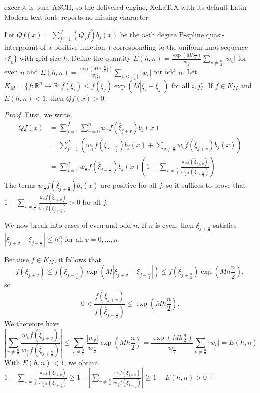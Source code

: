 \documentclass[10pt,a4paper]{amsart}
\newcommand{\floorn}{\lfloor \frac{n}{2}\rfloor}
\newcommand{\fracn}{\frac{n}{2}}
\begin{document}
excerpt is pure ASCII, so the delivered engine, XeLaTeX with its default Latin Modern text font, reports no missing character.
\begin{theorem}
Let $Qf(x)=\sum_{j=1}^J(Q_jf)b_j(x)$ be the $n$-th degree B-spline quasi-interpolant of a positive function $f$ corresponding to the uniform knot sequence $\{\xi_k\}$ with grid size $h$.  Define the quantity $E(h,n)=\frac{\exp(Mh\fracn)}{w_{\fracn}}\sum_{v\neq{\fracn}}|w_v|$ for even $n$ and $E(h,n)=\frac{\exp(Mh\floorn)}{w_{\floorn}}\sum_{v<{\floorn}}|w_v|$ for odd $n$. Let $K_M=\{f:\mathbb{R}^n\to\mathbb{R}:f(\overline\xi_i)\leq f(\overline\xi_j)\exp(M|\xi_i-\xi_j|)\text{ for all $i,j$}\}$. If $f\in K_M$ and $E(h,n)<1$, then $Qf(x)>0$.
\label{thm:1dhiddenpos}
\end{theorem}

\begin{proof}
First, we write,
\begin{align*}
    Qf(x)&=\sum_{j=1}^J\sum_{v=0}^nw_vf(\overline\xi_{j+v})b_j(x)\\
    &=\sum_{j=1}^J\left(w_{\fracn} f(\overline\xi_{j+\fracn})b_j(x)+\sum_{v\neq\fracn}w_vf(\overline\xi_{j+v})b_j(x)\right)\\
    &=\sum_{j=1}^Jw_{\fracn}f(\overline\xi_{j+\fracn})b_j(x)\left(1+\sum_{v\neq\fracn}\frac{w_vf(\overline\xi_{j+v})}{w_{\fracn} f(\overline\xi_{j+\fracn})}\right)
\end{align*}
The terms $w_{\fracn}f(\overline\xi_{j+\fracn})b_j(x)$ are positive for all $j$, so it suffices to prove that $1+\sum_{v\neq\fracn}\frac{w_vf(\overline\xi_{j+v})}{w_{\fracn} f(\overline\xi_{j+\fracn})}>0$ for all $j$.

We now break into cases of even and odd $n$. If $n$ is even, then $\xi_{j+\fracn}$ satisfies $|\xi_{j+v}-\xi_{j+\fracn}|\leq h\fracn$ for all $v=0,\dots,n$.

Because $f\in K_M$, it follows that 
$$f(\overline\xi_{j+v})\leq f(\overline\xi_{j+\fracn})\exp(M|\xi_{j+v}-\xi_{j+\fracn}|)\leq f(\overline\xi_{j+\fracn})\exp(Mh\fracn),$$ 
so 
$$0<\dfrac{f(\overline\xi_{j+v})}{f(\overline\xi_{j+\fracn})}\leq \exp(Mh\fracn).$$ %
We therefore have
$$\left|\sum_{v\neq\fracn}\frac{w_vf(\overline\xi_{j+v})}{w_\fracn f(\overline\xi_{j+\fracn})}\right|\leq \sum_{v\neq \fracn}\frac{|w_v|}{w_\fracn}\exp(Mh\fracn)=\frac{\exp(Mh\fracn)}{w_\fracn}\sum_{v\neq\fracn}|w_v|=E(h,n)$$
With $E(h,n)<1$, we obtain $1+\sum_{v\neq\fracn}\frac{w_vf(\overline\xi_{j+v})}{w_\fracn f(\overline\xi_{j+\fracn})}\geq 1-\left|\sum_{v\neq\fracn}\frac{w_vf(\overline\xi_{j+v})}{w_\fracn f(\overline\xi_{j+\fracn})}\right|\geq 1-E(h,n)>0$


\end{proof}
\end{document}
